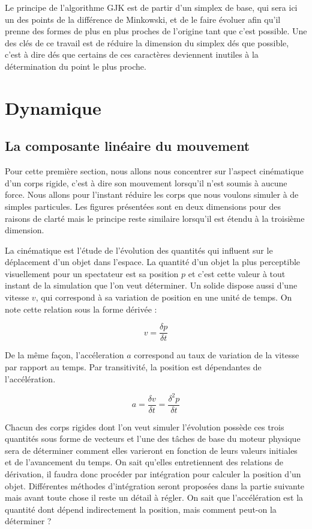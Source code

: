 \documentclass[twocolumn]{article}
\begin{document}
Le principe de l'algorithme GJK est de partir d'un simplex de base, qui sera ici un des points de la différence de Minkowski, et de le faire évoluer afin qu'il prenne des formes de plus en plus proches de l'origine tant que c'est possible. Une des clés de ce travail est de réduire la dimension du simplex dés que possible, c'est à dire dés que certains de ces caractères deviennent inutiles à la détermination du point le plus proche.

\section{Dynamique} 

\subsection{La composante linéaire du mouvement}

Pour cette première section, nous allons nous concentrer sur l'aspect cinématique d'un corps rigide, c'est à dire son mouvement lorsqu'il n'est soumis à aucune force. Nous allons pour l'instant réduire les corps que nous voulons simuler à de simples particules. Les figures présentées sont en deux dimensions pour des raisons de clarté mais le principe reste similaire lorsqu'il est étendu à la troisième dimension.

La cinématique est l'étude de l'évolution des quantités qui influent sur le déplacement d'un objet dans l'espace. La quantité d'un objet la plus perceptible visuellement pour un spectateur est sa position $p$ et c'est cette valeur à tout instant de la simulation que l'on veut déterminer. Un solide dispose aussi d'une vitesse $v$, qui correspond à sa variation de position en une unité de temps. On note cette relation sous la forme dérivée :

\[v = \frac{\delta p}{\delta t}\]

De la même façon, l'accéleration $a$ correspond au taux de variation de la vitesse par rapport au temps. Par transitivité, la position est dépendantes de l'accélération.

\[a = \frac{\delta v}{\delta t} = \frac{\delta^2 p}{\delta t}\]

Chacun des corps rigides dont l'on veut simuler l'évolution possède ces trois quantités sous forme de vecteurs et l'une des tâches de base du moteur physique sera de déterminer comment elles varieront en fonction de leurs valeurs initiales et de l'avancement du temps. On sait qu'elles entretiennent des relations de dérivation, il faudra donc procéder par intégration pour calculer la position d'un objet. Différentes méthodes d'intégration seront proposées dans la partie suivante mais avant toute chose il reste un détail à régler. On sait que l'accélération est la quantité dont dépend indirectement la position, mais comment peut-on la déterminer ?
\end{document}
